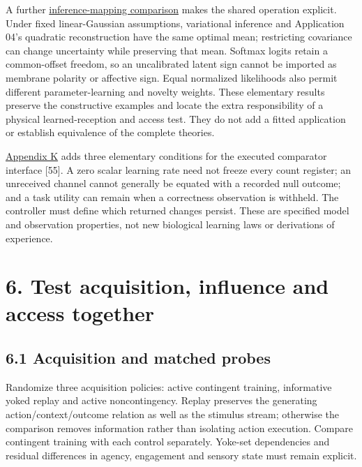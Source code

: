 \documentclass[
  american,
  11pt,
  letterpaper,
]{article}
\begin{document}
A further \href{https://zenodo.org/records/23455801/files/Learning-to-Feel-Technical-Supplement-v1.1.pdf\#appendix-j}{inference-mapping comparison} makes the shared operation explicit. Under fixed linear-Gaussian assumptions, variational inference and Application 04's quadratic reconstruction have the same optimal mean; restricting covariance can change uncertainty while preserving that mean. Softmax logits retain a common-offset freedom, so an uncalibrated latent sign cannot be imported as membrane polarity or affective sign. Equal normalized likelihoods also permit different parameter-learning and novelty weights. These elementary results preserve the constructive examples and locate the extra responsibility of a physical learned-reception and access test. They do not add a fitted application or establish equivalence of the complete theories.

\href{https://zenodo.org/records/23455801/files/Learning-to-Feel-Technical-Supplement-v1.1.pdf\#appendix-k}{Appendix K} adds three elementary conditions for the executed comparator interface {[}55{]}. A zero scalar learning rate need not freeze every count register; an unreceived channel cannot generally be equated with a recorded null outcome; and a task utility can remain when a correctness observation is withheld. The controller must define which returned changes persist. These are specified model and observation properties, not new biological learning laws or derivations of experience.

\section{6. Test acquisition, influence and access together}\label{test-acquisition-influence-and-access-together}

\subsection{6.1 Acquisition and matched probes}\label{acquisition-and-matched-probes}

Randomize three acquisition policies: active contingent training, informative yoked replay and active noncontingency. Replay preserves the generating action/context/outcome relation as well as the stimulus stream; otherwise the comparison removes information rather than isolating action execution. Compare contingent training with each control separately. Yoke-set dependencies and residual differences in agency, engagement and sensory state must remain explicit.
\end{document}

